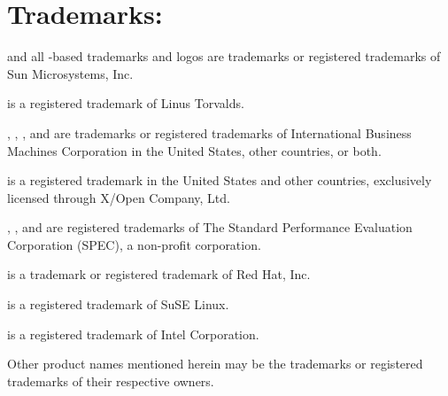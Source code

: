 \section*{Trademarks:}
\label{trademarks}

{\bf \JavaTM} and all \JavaTM{}-based trademarks and logos are trademarks or
registered trademarks of Sun Microsystems, Inc.

{\bf \LinuxR} is a registered trademark of Linus Torvalds.

{\bf \AIXTM}, {\bf \PowerPCTM}, {\bf \IBMR}, and {\bf \JikesTM} are
trademarks or 
registered trademarks of International Business Machines Corporation in the
United States, other countries, or both.

{\bf \UnixR} is a registered trademark in the United States and other
countries, exclusively licensed through X/Open Company, Ltd.

{\bf \SPECjvmR}, {\bf \SPECjbbR}, and {\bf \SPECR} are registered
trademarks of The Standard Performance Evaluation Corporation (SPEC),
a non-profit corporation. 

{\bf \RedHatTM} is a trademark or registered trademark of Red Hat, Inc.

{\bf \SuSER} is a registered trademark of SuSE Linux.

{\bf \IntelR} is a registered trademark of Intel Corporation.

Other product names mentioned herein may be the trademarks or
registered trademarks of their respective owners.

